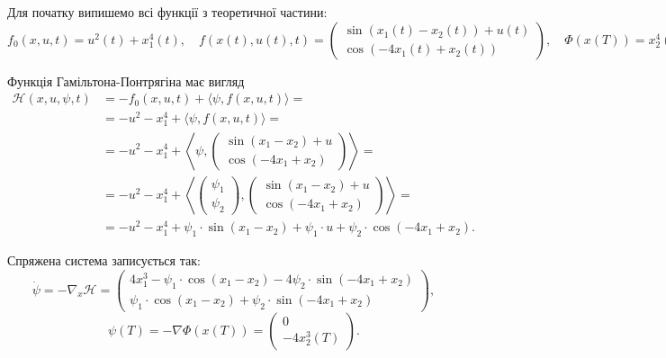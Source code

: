 \begin{solution}
    Для початку випишемо всі функції з теоретичної частини:
    \begin{equation}
        f_0(x, u, t) = u^2(t) + x_1^4(t), \quad f(x(t), u(t), t) = \begin{pmatrix} \sin(x_1(t) - x_2(t)) + u(t) \\ \cos(-4x_1(t) + x_2(t)) \end{pmatrix}, \quad \Phi(x(T)) = x_2^4(T).
    \end{equation}

    Функція Гамільтона-Понтрягіна має вигляд
    \begin{equation}
        \begin{aligned}
        \mathcal{H} (x, u, \psi, t) &= - f_0(x, u, t) + \langle \psi, f(x, u, t) \rangle = \\
        &= - u^2 - x_1^4 + \langle \psi, f(x, u, t) \rangle = \\
        &= - u^2 - x_1^4 + \left\langle \psi, \begin{pmatrix} \sin(x_1 - x_2) + u \\ \cos(-4x_1 + x_2) \end{pmatrix} \right\rangle = \\
        &= - u^2 - x_1^4 + \left\langle \begin{pmatrix} \psi_1 \\ \psi_2 \end{pmatrix}, \begin{pmatrix} \sin(x_1 - x_2) + u \\ \cos(-4x_1 + x_2) \end{pmatrix} \right\rangle = \\
        &= - u^2 - x_1^4 + \psi_1 \cdot \sin(x_1 - x_2) + \psi_1 \cdot u + \psi_2 \cdot \cos(-4x_1 + x_2).
        \end{aligned}
    \end{equation}
    
    Спряжена система записується так:
    \begin{equation} 
        \dot \psi = - \nabla_x \mathcal{H} = \begin{pmatrix} 4 x_1^3 - \psi_1 \cdot \cos(x_1 - x_2) - 4 \psi_2 \cdot \sin(-4x_1 + x_2) \\ \psi_1 \cdot \cos(x_1 - x_2) + \psi_2 \cdot \sin(-4x_1 + x_2) \end{pmatrix},
    \end{equation}
    \begin{equation} 
        \psi(T) = - \nabla \Phi(x(T)) = \begin{pmatrix} 0 \\ - 4 x_2^3(T) \end{pmatrix}.
    \end{equation}
    

\end{solution}

